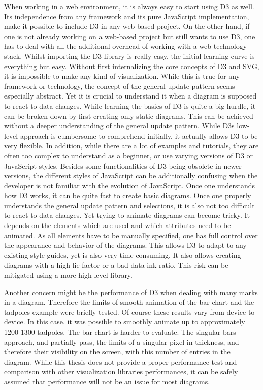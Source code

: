 When working in a web environment, it is always easy to start using D3 as well. Its independence from any framework and its pure JavaScript implementation, make it possible to include D3 in any web-based project. On the other hand, if one is not already working on a web-based project but still wants to use D3, one has to deal with all the additional overhead of working with a web technology stack. Whilst importing the D3 library is really easy, the initial learning curve is everything but easy. Without first internalizing the core concepts of D3 and SVG, it is impossible to make any kind of visualization. While this is true for any framework or technology, the concept of the general update pattern seems especially abstract. Yet it is crucial to understand it when a diagram is supposed to react to data changes.
While learning the basics of D3 is quite a big hurdle, it can be broken down by first creating only static diagrams. This can be achieved without a deeper understanding of the general update pattern. While D3s low-level approach is cumbersome to comprehend initially, it actually allows D3 to be very flexible.
In addition, while there are a lot of examples and tutorials, they are often too complex to understand as a beginner, or use varying versions of D3 or JavaScript styles. Besides some functionalities of D3 being obsolete in newer versions, the different styles of JavaScript can be additionally confusing when the developer is not familiar with the evolution of JavaScript.
Once one understands how D3 works, it can be quite fast to create basic diagrams. Once one properly understands the general update pattern and selections, it is also not too difficult to react to data changes. Yet trying to animate diagrams can become tricky. It depends on the elements which are used and which attributes need to be animated. As all elements have to be manually specified, one has full control over the appearance and behavior of the diagrams. This allows D3 to adapt to any existing style guides, yet is also very time consuming. It also allows creating diagrams with a high lie-factor or a bad data-ink ratio. This risk can be mitigated using a more high-level library.

Another concern might be the performance of D3 when dealing with many marks in a diagram. Therefore the limits of smooth animation of the bar-chart and the tadpoles example\cite{bostock_2020} were briefly tested. Of course these results vary from device to device. In this case, it was possible to smoothly animate up to approximately 1200-1300 tadpoles. The bar-chart is harder to evaluate. The singular bars approach, and partially pass, the limits of a singular pixel in thickness, and therefore their visibility on the screen, with this number of entries in the diagram. While this thesis does not provide a proper performance test and comparison with other visualization libraries performances, it can be safely assumed that performance will not be an issue for most diagrams.

